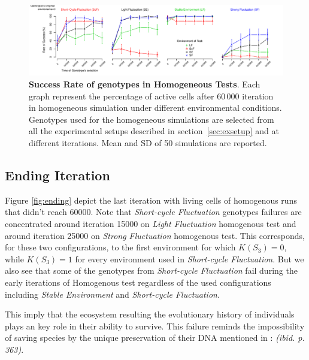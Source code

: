 \begin{figure}[h]
\centering
\includegraphics[width=2\columnwidth]{img/testSurvivingRates}
\caption{\textbf{Success Rate of genotypes in Homogeneous Tests}. Each graph represent the percentage of active cells after 60\,000 iteration in homogeneous simulation under different environmental conditions. Genotypes used for the homogeneous simulations are selected from all the experimental setups described in section~\ref{sec:exsetup} and at different iterations. Mean and SD of 50 simulations are reported.  }
\label{fig:survrate}
\end{figure}

\subsection{Ending Iteration}

Figure \ref{fig:ending} depict the last iteration with living cells of homogenous runs that didn't reach 60000. Note that \emph{Short-cycle Fluctuation} genotypes failures are concentrated around iteration 15000 on \emph{Light Fluctuation} homogenous test and around iteration 25000 on \emph{Strong Fluctuation} homogenous test. This corresponds, for these two configurations, to the first environment for which $K(S_3)=0$, while $K(S_3)=1$ for every environment used in \emph{Short-cycle Fluctuation}. But we also see that some of the genotypes from \emph{Short-cycle Fluctuation} fail during the early iterations of Homogenous test regardless of the used configurations including \emph{Stable Environment} and \emph{Short-cycle Fluctuation}.

This imply that the ecosystem resulting the evolutionary history of individuals plays an key role in their ability to survive. This failure reminds the impossibility of saving species by the unique preservation of their DNA mentioned in \cite{jablonka2014evolution}: \emph{(ibid. p. 363)}.

